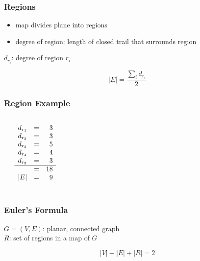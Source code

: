 \documentclass[dvipsnames]{beamer}
\begin{document}
\begin{frame}
  \frametitle{Regions}

  \begin{itemize}
    \item map divides plane into \alert{regions}
    \item degree of region: length of closed trail that surrounds region
  \end{itemize}

  \pause
  \begin{theorem}
    $d_{r_i}$: degree of region $r_i$

    \[ |E| = \frac{\sum_i d_{r_i}}{2} \]
  \end{theorem}
\end{frame}

\begin{frame}
  \frametitle{Region Example}

  \begin{columns}
    \begin{center}
    \end{center}

    $\begin{array}{rcr}
      d_{r_1} & = & 3\\
      d_{r_2} & = & 3\\
      d_{r_3} & = & 5\\
      d_{r_4} & = & 4\\
      d_{r_5} & = & 3\\\hline
              & = & 18\\
      \medskip
      |E|     & = & 9
    \end{array}$
  \end{columns}
\end{frame}

\begin{frame}
  \frametitle{Euler's Formula}

  \begin{theorem}
    $G=(V,E)$: planar, connected graph\\
    $R$: set of regions in a map of $G$

    \[|V| - |E| + |R| = 2\]
  \end{theorem}
\end{frame}
\end{document}
